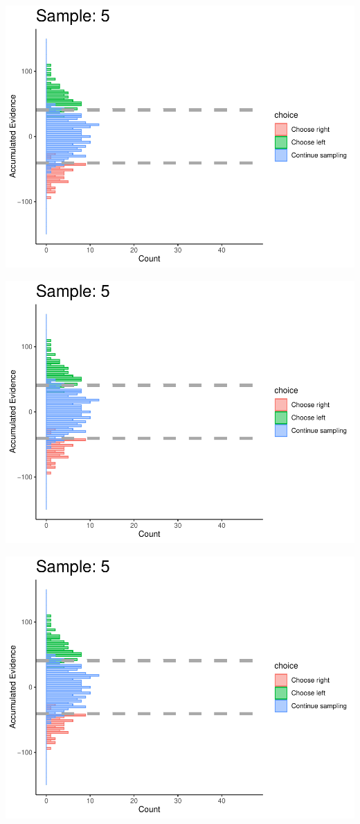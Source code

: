 \documentclass[
]{book}
\begin{document}
\begin{center}\includegraphics[width=0.8\linewidth]{LateNightBayes_files/figure-latex/collapsing_check-44} \end{center}

\begin{center}\includegraphics[width=0.8\linewidth]{LateNightBayes_files/figure-latex/collapsing_check-45} \end{center}

\begin{center}\includegraphics[width=0.8\linewidth]{LateNightBayes_files/figure-latex/collapsing_check-46} \end{center}
\end{document}
